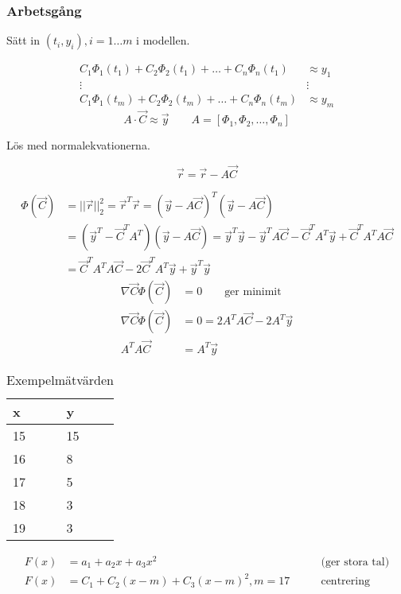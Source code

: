 \documentclass[a4paper,10pt,swedish]{memoir}
\numberwithin{equation}{subsection}
\begin{document}
\subsubsection{Arbetsgång}

Sätt in $(t_i, y_i), i=1\ldots m$ i modellen.

\begin{align}
C_1\Phi_1(t_1) + C_2\Phi_2(t_1) + \ldots + C_n\Phi_n(t_1) &\approx y_1 \\
\vdots &\vdots \\
C_1\Phi_1(t_m) + C_2\Phi_2(t_m) + \ldots + C_n\Phi_n(t_m) &\approx y_m
\end{align}
\begin{equation}
A\cdot \vec{C} \approx \vec{y} \qquad A=\left[\Phi_1,\Phi_2, \ldots,\Phi_n\right]
\end{equation}

Lös med normalekvationerna.

\begin{equation}
\vec{r} = \vec{r} - A\vec{C}
\end{equation}

\begin{align*}
\Phi(\vec{C}) &= ||\vec{r}||_2^2 = \vec{r}^T\vec{r} = (\vec{y}-A\vec{C})^T(\vec{y}-A\vec{C}) \\
&= (\vec{y}^T-\vec{C}^TA^T)(\vec{y}-A\vec{C})=\vec{y}^T\vec{y}-\vec{y}^TA\vec{C} - \vec{C}^TA^T\vec{y} + \vec{C}^TA^TA\vec{C} \\
&= \vec{C}^TA^TA\vec{C}-2\vec{C}^TA^T\vec{y} + \vec{y}^T\vec{y}
\end{align*}
\begin{align}
\nabla\vec{C}\Phi(\vec{C})&=0 \qquad \text{ger minimit} \\
\nabla\vec{C}\Phi(\vec{C})&=0=2A^TA\vec{C}-2A^T\vec{y} \\
A^TA\vec{C}&=A^T\vec{y}
\end{align}

\begin{table}[h]
\centering
\begin{tabular}{l l}
x & y \\ \hline
15 & 15 \\
16 & 8 \\
17 & 5 \\
18 & 3 \\
19 & 3
\end{tabular}
\caption{Exempelmätvärden}
\end{table}

\begin{align}
F(x)&=a_1 + a_2 x + a_3x^2 \qquad &\text{(ger stora tal)} \\
F(x)&=C_1 + C_2(x-m) + C_3(x-m)^2, m=17 \qquad &\text{centrering}
\end{align}
\end{document}
